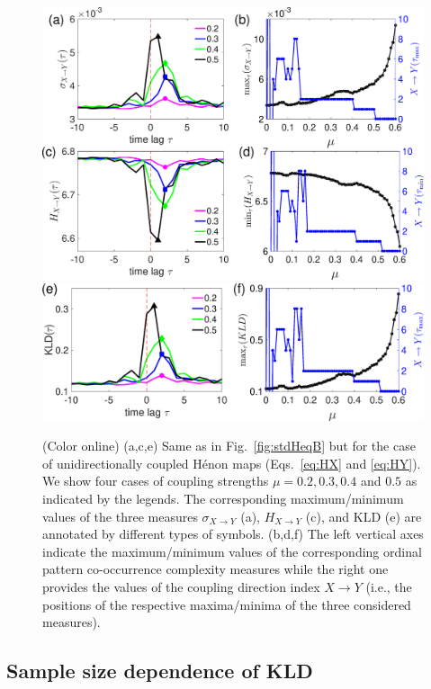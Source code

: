 \documentclass[12pt,aip,cha,reprint,nofootinbib]{revtex4-1}
\begin{document}
\begin{figure}
	\centering
	\includegraphics[width=\columnwidth]{henonMaps.eps}
	\includegraphics[width=\columnwidth]{henon_KL.eps}
\caption{(Color online) (a,c,e) Same as in Fig.~\ref{fig:stdHeqB} but for the case of unidirectionally coupled H\'enon maps (Eqs.~\eqref{eq:HX} and \eqref{eq:HY}). We show four cases of coupling strengths $\mu = 0.2, 0.3, 0.4$ and $0.5$ as indicated by the legends. The corresponding maximum/minimum values of the three measures $\sigma_{X \to Y}$ (a), $H_{X \to Y}$ (c), and $\text{KLD}$ (e) are annotated by different types of symbols. (b,d,f) The left vertical axes indicate the maximum/minimum values of the corresponding ordinal pattern co-occurrence complexity measures while the right one provides the values of the coupling direction index $X \to Y$ (i.e., the positions of the respective maxima/minima of the three considered measures). \label{fig:stdHeqXY}}
\end{figure}


\subsection{Sample size dependence of KLD}
\end{document}
